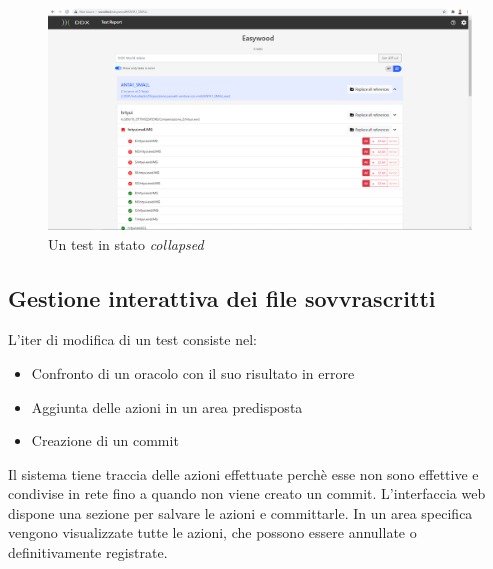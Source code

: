             \begin{figure}
                \includegraphics[width=\textwidth]{images/collpapsed.png}
                \caption{Un test in stato \textit{collapsed}}
            \end{figure}
            
            \subsection{Gestione interattiva dei file sovvrascritti}
            L'iter di modifica di un test consiste nel: 
            \begin{itemize}
                \item Confronto di un oracolo con il suo risultato in errore
                \item Aggiunta delle azioni in un area predisposta
                \item Creazione di un commit
            \end{itemize}      
            Il sistema tiene traccia delle azioni effettuate perchè esse non sono effettive e condivise in rete fino a quando non viene creato un commit.
            L'interfaccia web dispone una sezione per salvare le azioni e committarle.
            In un area specifica vengono visualizzate tutte le azioni, che possono essere annullate o definitivamente registrate.

